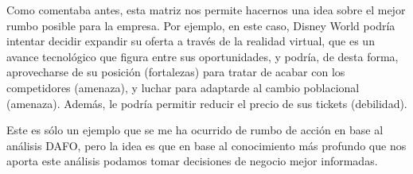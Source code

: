 \documentclass[a4paper]{article}
\begin{document}
Como comentaba antes, esta matriz nos permite hacernos una idea sobre el mejor rumbo posible para la empresa. Por ejemplo, en este caso, Disney World podría intentar decidir expandir su oferta a través de la realidad virtual, que es un avance tecnológico que figura entre sus oportunidades, y podría, de desta forma, aprovecharse de su posición (fortalezas) para tratar de acabar con los competidores (amenaza), y luchar para adaptarde al cambio poblacional (amenaza). Además, le podría permitir reducir el precio de sus tickets (debilidad).

Este es sólo un ejemplo que se me ha ocurrido de rumbo de acción en base al análisis DAFO, pero la idea es que en base al conocimiento más profundo que nos aporta este análisis podamos tomar decisiones de negocio mejor informadas.

{}
\end{document}
